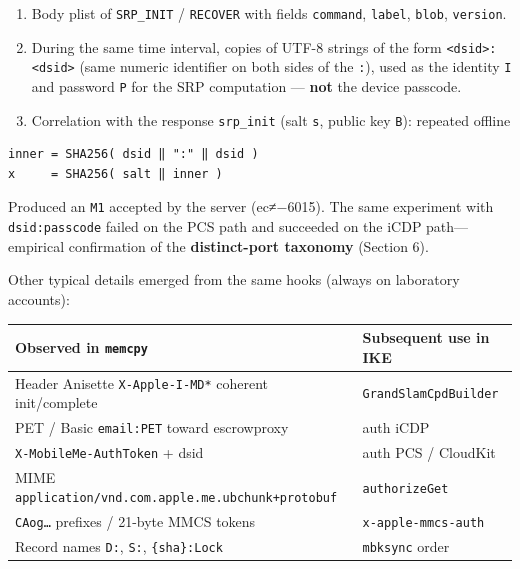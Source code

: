 \documentclass[
  english,
  10pt]{article}
\newcounter{none} %
\providecommand{\tightlist}{%
  \setlength{\itemsep}{0pt}\setlength{\parskip}{0pt}}
\begin{document}
\begin{enumerate}
\def\labelenumi{\arabic{enumi}.}
\tightlist
\item
  Body plist of \texttt{SRP\_INIT} / \texttt{RECOVER} with fields
  \texttt{command}, \texttt{label}, \texttt{blob}, \texttt{version}.
\item
  During the same time interval, copies of UTF-8 strings of the form
  \texttt{\textless{}dsid\textgreater{}:\textless{}dsid\textgreater{}}
  (same numeric identifier on both sides of the \texttt{:}), used as the
  identity \texttt{I} and password \texttt{P} for the SRP computation
  --- \textbf{not} the device passcode.
\item
  Correlation with the response \texttt{srp\_init} (salt \texttt{s},
  public key \texttt{B}): repeated offline
\end{enumerate}

\begin{verbatim}
inner = SHA256( dsid ‖ ":" ‖ dsid )
x     = SHA256( salt ‖ inner )
\end{verbatim}

Produced an \texttt{M1} accepted by the server (ec≠−6015). The same
experiment with \texttt{dsid:passcode} failed on the PCS path and
succeeded on the iCDP path---empirical confirmation of the
\textbf{distinct-port taxonomy} (Section 6).

Other typical details emerged from the same hooks (always on laboratory
accounts):

{\def\LTcaptype{none} %
\begin{longtable}[]{@{}
  >{\raggedright\arraybackslash}p{}
  >{\raggedright\arraybackslash}p{}@{}}
\toprule\noalign{}
\begin{minipage}[b]{\linewidth}\raggedright
Observed in \texttt{memcpy}
\end{minipage} & \begin{minipage}[b]{\linewidth}\raggedright
Subsequent use in IKE
\end{minipage} \\
\midrule\noalign{}
\endhead
\bottomrule\noalign{}
\endlastfoot
Header Anisette \texttt{X-Apple-I-MD*} coherent init/complete &
\texttt{GrandSlamCpdBuilder} \\
PET / Basic \texttt{email:PET} toward escrowproxy & auth iCDP \\
\texttt{X-MobileMe-AuthToken} + dsid & auth PCS / CloudKit \\
MIME \texttt{application/vnd.com.apple.me.ubchunk+protobuf} &
\texttt{authorizeGet} \\
\texttt{CAog…} prefixes / 21-byte MMCS tokens &
\texttt{x-apple-mmcs-auth} \\
Record names \texttt{D:}, \texttt{S:}, \texttt{\{sha\}:Lock} &
\texttt{mbksync} order \\
\end{longtable}
}
\end{document}

